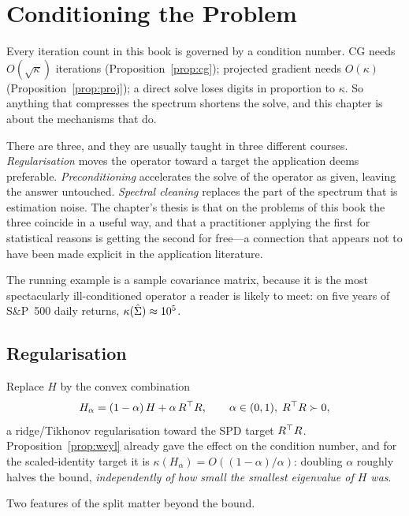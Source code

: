 \chapter{Conditioning the Problem}
\label{ch:conditioning}

Every iteration count in this book is governed by a condition number. CG needs
$O(\sqrt\kappa)$ iterations (Proposition~\ref{prop:cg}); projected gradient needs
$O(\kappa)$ (Proposition~\ref{prop:proj}); a direct solve loses digits in proportion
to $\kappa$. So anything that compresses the spectrum shortens the solve, and this
chapter is about the mechanisms that do.

There are three, and they are usually taught in three different courses. \emph{
Regularisation} moves the operator toward a target the application deems preferable.
\emph{Preconditioning} accelerates the solve of the operator as given, leaving the
answer untouched. \emph{Spectral cleaning} replaces the part of the spectrum that is
estimation noise. The chapter's thesis is that on the problems of this book the three
coincide in a useful way, and that a practitioner applying the first for statistical
reasons is getting the second for free---a connection that appears not to have been
made explicit in the application literature.

The running example is a sample covariance matrix, because it is the most
spectacularly ill-conditioned operator a reader is likely to meet: on five years of
S\&P~500 daily returns, $\kappa(\hat{\Sigma}) \approx 10^5$.

\section{Regularisation}

Replace $H$ by the convex combination
\begin{equation}\label{eq:regsplit}
  H_\alpha = (1-\alpha)\,H + \alpha\,R^{\top} R, \qquad \alpha \in (0,1),\; R^{\top} R \succ 0,
\end{equation}
a ridge/Tikhonov regularisation toward the SPD target $R^{\top} R$.
Proposition~\ref{prop:weyl} already gave the effect on the condition number, and for
the scaled-identity target it is $\kappa(H_\alpha) = O((1-\alpha)/\alpha)$: doubling
$\alpha$ roughly halves the bound, \emph{independently of how small the smallest
eigenvalue of $H$ was}.

Two features of the split matter beyond the bound.

